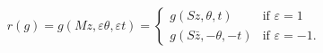 \begin{equation*}
  r(g) = g(Mz, \varepsilon \theta, \varepsilon t) = 
  \begin{cases}
    g(Sz, \theta, t) & \text{if $\varepsilon=1$}\\
    g(S\bar z, -\theta, -t) & \text{if $\varepsilon=-1$.}
  \end{cases}
\end{equation*}

